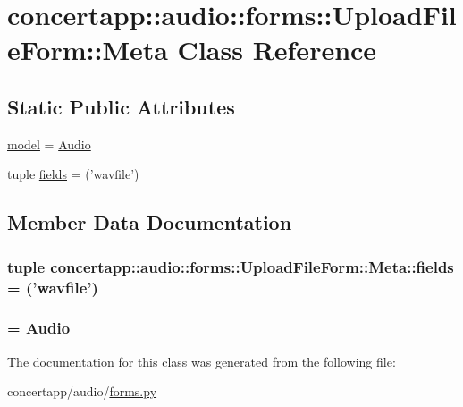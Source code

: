 \hypertarget{classconcertapp_1_1audio_1_1forms_1_1_upload_file_form_1_1_meta}{
\section{concertapp::audio::forms::UploadFileForm::Meta Class Reference}
\label{classconcertapp_1_1audio_1_1forms_1_1_upload_file_form_1_1_meta}
}
\subsection*{Static Public Attributes}
\begin{DoxyCompactItemize}
\item 
\hyperlink{classconcertapp_1_1audio_1_1forms_1_1_upload_file_form_1_1_meta_ad7ff25246db0e7ff5c938acfc1749693}{model} = \hyperlink{classconcertapp_1_1models_1_1_audio}{Audio}
\item 
tuple \hyperlink{classconcertapp_1_1audio_1_1forms_1_1_upload_file_form_1_1_meta_aeba34657c9e1cb6a53080b96904fd386}{fields} = ('wavfile')
\end{DoxyCompactItemize}


\subsection{Member Data Documentation}
\hypertarget{classconcertapp_1_1audio_1_1forms_1_1_upload_file_form_1_1_meta_aeba34657c9e1cb6a53080b96904fd386}{
\subsubsection[{fields}]{\setlength{\rightskip}{0pt plus 5cm}tuple {\bf concertapp::audio::forms::UploadFileForm::Meta::fields} = ('wavfile')}}
\label{classconcertapp_1_1audio_1_1forms_1_1_upload_file_form_1_1_meta_aeba34657c9e1cb6a53080b96904fd386}
\hypertarget{classconcertapp_1_1audio_1_1forms_1_1_upload_file_form_1_1_meta_ad7ff25246db0e7ff5c938acfc1749693}{
\subsubsection[{model}]{ = {\bf Audio}}}
\label{classconcertapp_1_1audio_1_1forms_1_1_upload_file_form_1_1_meta_ad7ff25246db0e7ff5c938acfc1749693}


The documentation for this class was generated from the following file:\begin{DoxyCompactItemize}
\item 
concertapp/audio/\hyperlink{audio_2forms_8py}{forms.py}\end{DoxyCompactItemize}
